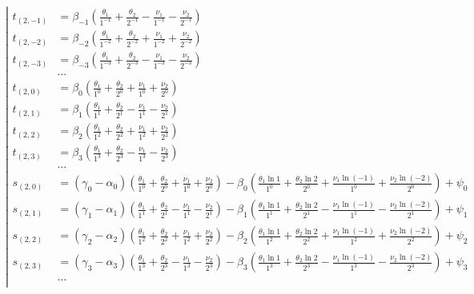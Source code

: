 \begin{equation*} \left| \begin{aligned}
t_{(2,-1)} &=
  \beta_{-1}
  \left(
  \frac{\theta_1}{1^{-1}}
+ \frac{\theta_2}{2^{-1}}
- \frac{\nu_1}{1^{-1}}
- \frac{\nu_2}{2^{-1}}
  \right) \\
%
t_{(2,-2)} &=
  \beta_{-2}
  \left(
  \frac{\theta_1}{1^{-2}}
+ \frac{\theta_2}{2^{-2}}
+ \frac{\nu_1}{1^{-2}}
+ \frac{\nu_2}{2^{-2}}
  \right) \\
%
t_{(2,-3)} &=
  \beta_{-3}
  \left(
  \frac{\theta_1}{1^{-3}}
+ \frac{\theta_2}{2^{-3}}
- \frac{\nu_1}{1^{-3}}
- \frac{\nu_2}{2^{-3}}
  \right) \\
%
&\ldots \\
%
t_{(2,0)} &=
  \beta_0
  \left(
  \frac{\theta_1}{1^0}
+ \frac{\theta_2}{2^0}
+ \frac{\nu_1}{1^0}
+ \frac{\nu_2}{2^0}
  \right) \\
%
t_{(2,1)} &=
  \beta_1
  \left(
  \frac{\theta_1}{1^1}
+ \frac{\theta_2}{2^1}
- \frac{\nu_1}{1^1}
- \frac{\nu_2}{2^1}
  \right) \\
%
t_{(2,2)} &=
  \beta_2
  \left(
  \frac{\theta_1}{1^2}
+ \frac{\theta_2}{2^2}
+ \frac{\nu_1}{1^2}
+ \frac{\nu_2}{2^2}
  \right) \\
%
t_{(2,3)} &=
  \beta_3
  \left(
  \frac{\theta_1}{1^3}
+ \frac{\theta_2}{2^3}
- \frac{\nu_1}{1^3}
- \frac{\nu_2}{2^3}
  \right) \\
%
&\ldots \\
%
s_{(2,0)} &=
  (\gamma_0 - \alpha_0)
  \left(
  \frac{\theta_1}{1^0}
+ \frac{\theta_2}{2^0}
+ \frac{\nu_1}{1^0}
+ \frac{\nu_2}{2^0}
  \right)
- \beta_0
  \left(
  \frac{\theta_1 \ln{1}}{1^0}
+ \frac{\theta_2 \ln{2}}{2^0}
+ \frac{\nu_1 \ln{(- 1)}}{1^0}
+ \frac{\nu_2 \ln{(- 2)}}{2^0}
  \right)
+ \psi_0 \\
%
s_{(2,1)} &=
  (\gamma_1 - \alpha_1)
  \left(
  \frac{\theta_1}{1^1}
+ \frac{\theta_2}{2^1}
- \frac{\nu_1}{1^1}
- \frac{\nu_2}{2^1}
  \right)
- \beta_1
  \left(
  \frac{\theta_1 \ln{1}}{1^1}
+ \frac{\theta_2 \ln{2}}{2^1}
- \frac{\nu_1 \ln{(- 1)}}{1^1}
- \frac{\nu_2 \ln{(- 2)}}{2^1}
  \right)
+ \psi_1 \\
%
s_{(2,2)} &=
  (\gamma_2 - \alpha_2)
  \left(
  \frac{\theta_1}{1^2}
+ \frac{\theta_2}{2^2}
+ \frac{\nu_1}{1^2}
+ \frac{\nu_2}{2^2}
  \right)
- \beta_2
  \left(
  \frac{\theta_1 \ln{1}}{1^2}
+ \frac{\theta_2 \ln{2}}{2^2}
+ \frac{\nu_1 \ln{(- 1)}}{1^2}
+ \frac{\nu_2 \ln{(- 2)}}{2^2}
  \right)
+ \psi_2 \\
%
s_{(2,3)} &=
  (\gamma_3 - \alpha_3)
  \left(
  \frac{\theta_1}{1^3}
+ \frac{\theta_2}{2^3}
- \frac{\nu_1}{1^3}
- \frac{\nu_2}{2^3}
  \right)
- \beta_3
  \left(
  \frac{\theta_1 \ln{1}}{1^3}
+ \frac{\theta_2 \ln{2}}{2^3}
- \frac{\nu_1 \ln{(- 1)}}{1^3}
- \frac{\nu_2 \ln{(- 2)}}{2^3}
  \right)
+ \psi_3 \\
%
&\ldots \\
\end{aligned} \right. \end{equation*}

